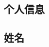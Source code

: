 \documentclass[a4paper]{article}
\begin{document}
\begin{CJK}{UTF8}{gkai}

\section*{个人信息}
\subsection*{姓名}

\end{CJK}
\end{document}
